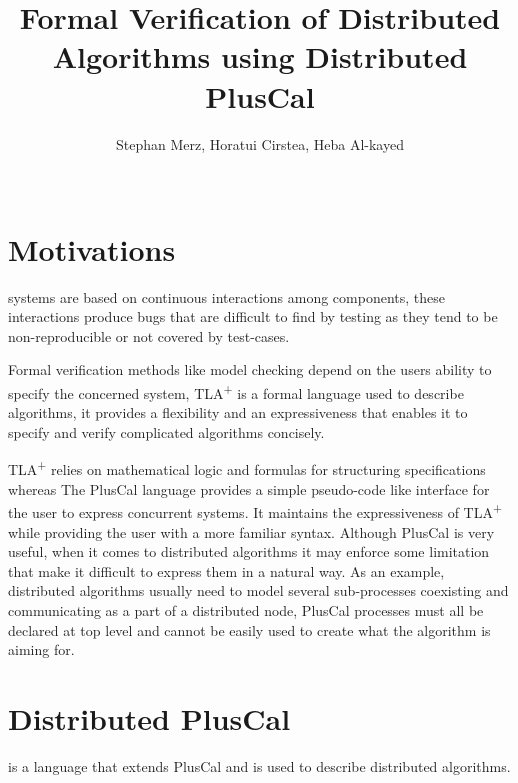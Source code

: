 \documentclass[journal]{IEEEtran}
\newcommand{\tlaplus}{TLA\textsuperscript{+}\xspace}
\begin{document}
    \title{Formal Verification of Distributed Algorithms using Distributed PlusCal}
  \author{Stephan Merz, Horatui Cirstea, Heba Al-kayed \\~
}  

\maketitle

\IEEEpeerreviewmaketitle

\section{Motivations}

 systems are based on continuous interactions among components, these interactions produce bugs that are difficult to find by testing as they tend to be non-reproducible or not covered by test-cases.

Formal verification methods like model checking \cite{ModelCheckingTLA} depend on the users ability to specify the concerned system, \tlaplus \cite{tlaplus} is a formal language used to describe algorithms, it provides a flexibility and an expressiveness that enables it to specify and verify complicated algorithms concisely.

\tlaplus relies on mathematical logic and formulas for structuring specifications whereas The PlusCal language \cite{pcalAlgo} provides a simple pseudo-code like interface for the user to express concurrent systems. It maintains the expressiveness of \tlaplus while providing the user with a more familiar syntax.
Although PlusCal is very useful, when it comes to distributed algorithms it may enforce some limitation that make it difficult to express them in a natural way. As an example, distributed algorithms usually need to model several sub-processes coexisting and communicating as a part of a distributed node, PlusCal processes must all be declared at top level and cannot be easily used to create what the algorithm is aiming for. 

\section{Distributed PlusCal}

 is a language that extends PlusCal and is used to describe distributed algorithms.
\end{document}
